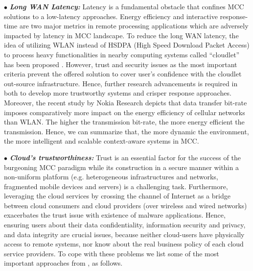 \documentclass[conference]{IEEEtran}
\begin{document}
\indent $\bullet$ \textit{\textbf{Long WAN Latency:}} Latency is a fundamental obstacle that confines MCC solutions to a low-latency approaches. Energy efficiency \cite{Miettinen2010} and interactive response-time \cite{Lagar-Cavilla} are two major metrics in remote processing applications which are adversely impacted by latency in MCC landscape. To reduce the long WAN latency, the idea of utilizing WLAN instead of HSDPA (High Speed Download Packet Access) to process heavy functionalities in nearby computing systems called ``cloudlet'' has been proposed \cite{Satyanarayanan2009}. However, trust and security issues as the most important criteria prevent the offered solution to cover user's confidence with the cloudlet out-source infrastructure. Hence, further research advancements is required in both to develop more trustworthy systems and crisper response approaches. Moreover, the recent study by Nokia Research \cite{Miettinen2010} depicts that data transfer bit-rate imposes comparatively more impact on the energy efficiency of cellular networks than WLAN. The higher the transmission bit-rate, the more energy efficient the transmission. Hence, we can summarize that, the more dynamic the environment, the more intelligent and scalable context-aware systems in MCC.

\indent $\bullet$ \textit{\textbf{Cloud's trustworthiness:}} Trust is an essential factor for the success of the burgeoning MCC paradigm \cite{ZohrehSanaei2012} while its construction in a secure manner within a non-uniform platform (e.g. heterogeneous infrastructures and networks, fragmented mobile devices and servers) is a challenging task. Furthermore, leveraging the cloud services by crossing the channel of Internet as a bridge between cloud consumers and cloud providers (over wireless and wired networks) exacerbates the trust issue with existence of malware applications. Hence, ensuring users about their data confidentiality, information security and privacy, and data integrity are crucial issues, because neither cloud-users have physically access to remote systems, nor know about the real business policy of each cloud service providers. To cope with these problems we list some of the most important approaches from \cite{Satyanarayanan2009},\cite{trustworthy} as follows.
\end{document}
